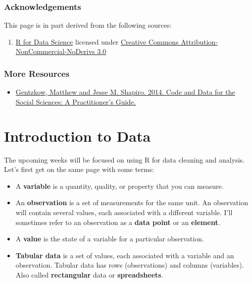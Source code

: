 \documentclass[]{book}
\providecommand{\tightlist}{%
  \setlength{\itemsep}{0pt}\setlength{\parskip}{0pt}}
\begin{document}
\subsubsection*{Acknowledgements}\label{acknowledgements}

This page is in part derived from the following sources:

\begin{enumerate}
\def\labelenumi{\arabic{enumi}.}
\tightlist
\item
  \href{https://r4ds.had.co.nz}{R for Data Science} licensed under
  \href{https://creativecommons.org/licenses/by-nc-nd/3.0/us/}{Creative
  Commons Attribution-NonCommercial-NoDerivs 3.0}
\end{enumerate}

\subsubsection*{More Resources}\label{more-resources}

\begin{itemize}
\tightlist
\item
  \href{https://web.stanford.edu/~gentzkow/research/CodeAndData.pdf}{Gentzkow,
  Matthew and Jesse M. Shapiro. 2014. Code and Data for the Social
  Sciences: A Practitioner's Guide.}
\end{itemize}

\section{Introduction to Data}\label{introduction-to-data}

The upcoming weeks will be focused on using R for data cleaning and
analysis. Let's first get on the same page with some terms:

\begin{itemize}
\item
  A \textbf{variable} is a quantity, quality, or property that you can
  measure.
\item
  An \textbf{observation} is a set of measurements for the same unit. An
  observation will contain several values, each associated with a
  different variable. I'll sometimes refer to an observation as a
  \textbf{data point} or an \textbf{element}.
\item
  A \textbf{value} is the state of a variable for a particular
  observation.
\item
  \textbf{Tabular data} is a set of values, each associated with a
  variable and an observation. Tabular data has rows (observations) and
  columns (variables). Also called \textbf{rectangular} data or
  \textbf{spreadsheets}.
\end{itemize}
\end{document}
